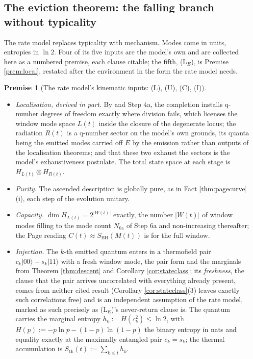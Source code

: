 \documentclass[11pt]{article}
\theoremstyle{definition}
\newtheorem{premise}[theorem]{Premise}
\newcommand{\Sth}{S_{\mathrm{th}}}
\begin{document}
\subsection{The eviction theorem: the falling branch without typicality}\label{subsec:eviction}

The rate model replaces typicality with mechanism. Modes come in units, entropies in $\ln 2$. Four of its five inputs are the model's own and are collected here as a numbered premise, each clause citable; the fifth, (L$_E$), is Premise \ref{prem:local}, restated after the environment in the form the rate model needs.

\begin{premise}[The rate model's kinematic inputs: (L), (U), (C), (I)]\label{prem:ratemodel}
\leavevmode
\begin{itemize}
\item[(L)] \emph{Localisation, derived in part.} By \cite[Thm.~4.4, Cor.~4.5, Thms 8.7, 8.12]{ButlerT4} and Step 4a, the completion installs q-number degrees of freedom exactly where division fails, which licenses the window mode space $L(t)$ inside the closure of the degenerate locus; the radiation $R(t)$ is a q-number sector on the model's own grounds, its quanta being the emitted modes carried off $E$ by the emission rather than outputs of the localisation theorems; and that these two exhaust the sectors is the model's exhaustiveness postulate. The total state space at each stage is $H_{L(t)} \otimes H_{R(t)}$.
\item[(U)] \emph{Purity.} The ascended description is globally pure, as in Fact \ref{thm:pagecurve}(i), each step of the evolution unitary.
\item[(C)] \emph{Capacity.} $\dim H_{L(t)} = 2^{|W(t)|}$ exactly, the number $|W(t)|$ of window modes filling to the mode count $N_{\mathrm{6a}}$ of Step 6a and non-increasing thereafter; the Page reading $C(t) \approx S_{\mathrm{BH}}(M(t))$ is for the full window.
\item[(I)] \emph{Injection.} The $k$-th emitted quantum enters in a thermofield pair $c_k|00\rangle + s_k|11\rangle$ with a fresh window mode, the pair form and the marginals from Theorem \ref{thm:descent} and Corollary \ref{cor:stateclass}; its \emph{freshness}, the clause that the pair arrives uncorrelated with everything already present, comes from neither cited result (Corollary \ref{cor:stateclass}(3) leaves exactly such correlations free) and is an independent assumption of the rate model, marked as such precisely as (L$_E$)'s never-return clause is. The quantum carries the marginal entropy $h_k := H(c_k^{2}) \leq \ln 2$, with $H(p) := -p\ln p - (1-p)\ln(1-p)$ the binary entropy in nats and equality exactly at the maximally entangled pair $c_k = s_k$; the thermal accumulation is $\Sth(t) := \sum_{k \leq t} h_k$.
\end{itemize}
\end{premise}
\end{document}
